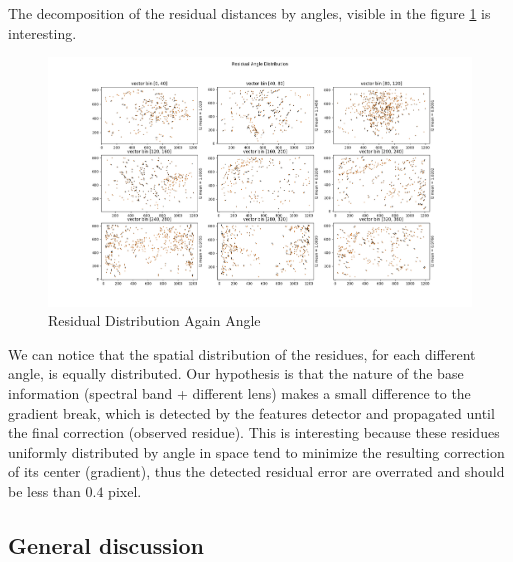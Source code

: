 \documentclass[]{elsarticle}
\begin{document}
	\newpage
	\par The decomposition of the residual distances by angles, visible in the figure \ref{fig:residual-angle} is interesting.
	
	\begin{figure}[H]
		\centering
		\includegraphics[width=\linewidth]{../figures/perspective-features-residual.png}
		\caption{Residual Distribution Again Angle}
		\label{fig:residual-angle}
	\end{figure}

	We can notice that the spatial distribution of the residues, for each different angle, is equally distributed.
	Our hypothesis is that the nature of the base information (spectral band + different lens) makes a small difference to the gradient break,
	which is detected by the features detector and propagated until the final correction (observed residue).
	This is interesting because these residues uniformly distributed by angle in space tend to minimize the resulting correction of its center (gradient),
	thus the detected residual error are overrated and should be less than $0.4$ pixel.

	\subsection{General discussion}
	
\end{document}
